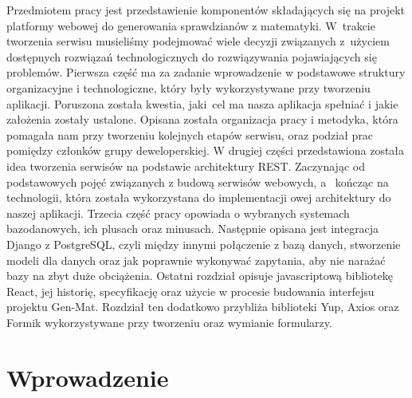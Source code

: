 \documentclass[oneside,polski,logo,indent]{amuthesis}
\date{Poznań, \today{} r.}
\begin{document}
\maketitle
\makestatement

\begin{streszczenie}
Przedmiotem pracy jest przedstawienie komponentów składających się na projekt platformy webowej do generowania sprawdzianów z matematyki. W~trakcie tworzenia serwisu musieliśmy podejmować wiele decyzji związanych z~użyciem dostępnych rozwiązań technologicznych do rozwiązywania pojawiających się problemów.
Pierwsza część ma za zadanie wprowadzenie w podstawowe struktury organizacyjne i technologiczne, który były wykorzystywane przy tworzeniu aplikacji. Poruszona została kwestia, jaki~cel ma nasza aplikacja spełniać i jakie założenia zostały ustalone. Opisana została organizacja pracy i metodyka, która pomagała nam przy tworzeniu kolejnych etapów serwisu, oraz podział prac pomiędzy członków grupy deweloperskiej.
W drugiej części przedstawiona została idea tworzenia serwisów na podstawie architektury REST. Zaczynając od podstawowych pojęć związanych z budową serwisów webowych, a~ kończąc na technologii, która została wykorzystana do implementacji owej architektury do naszej aplikacji.
Trzecia część pracy opowiada o wybranych systemach bazodanowych, ich plusach oraz minusach. Następnie opisana jest integracja Django z PostgreSQL, czyli między innymi połączenie z bazą danych, stworzenie modeli dla danych oraz jak poprawnie wykonywać zapytania, aby nie narażać bazy na zbyt duże obciążenia.
Ostatni rozdział opisuje javascriptową bibliotekę React, jej historię, specyfikację oraz użycie w procesie budowania interfejsu projektu Gen-Mat. Rozdział ten dodatkowo przybliża biblioteki Yup, Axios oraz Formik wykorzystywane przy tworzeniu oraz wymianie formularzy.
\end{streszczenie}


\tableofcontents


\chapter{Wprowadzenie}
\end{document}
